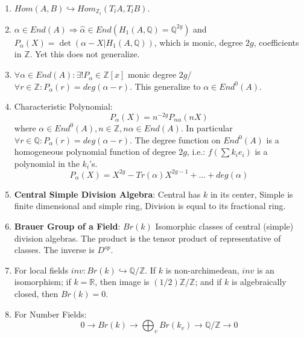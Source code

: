 \documentclass{article}
\newcommand{\Q}{\mathbb{Q}}
\newcommand{\R}{\mathbb{R}}
\newcommand{\Z}{\mathbb{Z}}
\newcommand{\ra}{\rightarrow}
\newcommand{\Ra}{\Rightarrow}
\newcommand{\hra}{\hookrightarrow}
\begin{document}
\begin{multicols}{2}
\begin{enumerate}
\item $Hom(A,B) \hra Hom_{\Z_l}(T_lA, T_lB)$.

\item $\alpha \in End(A) \Ra \hat{\alpha} \in End(H_1(A,\Q) = \Q^{2g})$ and $P_\alpha(X) = \det(\alpha - X|H_1(A,\Q))$, which is monic, degree $2g$, coefficients in $\Z$. Yet this does not generalize. 

\item $\forall \alpha \in End(A): \exists ! P_\alpha \in \Z[x]$ monic degree $2g$/ $\forall r \in \Z: P_\alpha(r) = deg(\alpha - r)$. This generalize to $\alpha \in End^0(A)$.

\item Characteristic Polynomial:  
\[P_\alpha(X) = n^{-2g}P_{n\alpha}(nX)\]
where $\alpha \in End^0(A), n \in \Z, n\alpha \in End(A)$. In particular $\forall r \in \Q: P_\alpha(r) = deg(\alpha - r)$. The degree function on $End^0(A)$ is a homogeneous polynomial function of degree $2g$, i.e.: $f(\sum k_ie_i)$ is a polynomial in the $k_i$'s.
\[P_\alpha(X) = X^{2g} - Tr(\alpha)X^{2g-1} + \ldots + deg(\alpha)\]


\item \textbf{Central Simple Division Algebra}: Central has $k$ in its center, Simple is finite dimensional and simple ring, Division is equal to its fractional ring. 

\item \textbf{Brauer Group of a Field}: $Br(k)$ Isomorphic classes of central (simple) division algebras. The product is the tensor product of representative of classes. The inverse is $D^{op}$. 

\item For local fields $inv: Br(k) \hra \Q/\Z$. If $k$ is non-archimedean, $inv$ is an isomorphism; if $k = \R$, then image is $(1/2)\Z/\Z$; and if $k$ is algebraically closed, then $Br(k) = 0$.

\item For Number Fields:
\[0 \ra Br(k) \ra \bigoplus_v Br(k_v) \ra \Q/\Z \ra 0\]
 

\end{enumerate}
\end{multicols}
\end{document}
